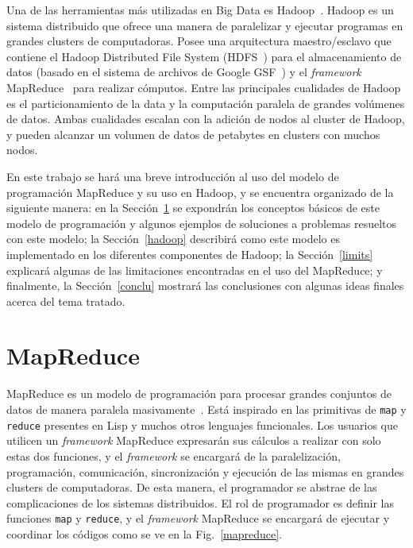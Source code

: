 \documentclass[conference]{IEEEtran}
\begin{document}
Una de las herramientas más utilizadas en Big Data es Hadoop~\cite{Hadoop}.
Hadoop es un sistema distribuido que ofrece una manera de paralelizar y ejecutar programas en grandes clusters de computadoras.
Posee una arquitectura maestro/esclavo que contiene el Hadoop Distributed File System (HDFS~\cite{HDFS10}) para el almacenamiento de datos (basado en el sistema de archivos de Google GSF~\cite{GoogleFS03}) y el \textit{framework} MapReduce~\cite{MapReduce04}\cite{MapReduceII08} para realizar cómputos.
Entre las principales cualidades de Hadoop es el particionamiento de la data y la computación paralela de grandes volúmenes de datos.
Ambas cualidades escalan con la adición de nodos al cluster de Hadoop, y pueden alcanzar un volumen de datos de petabytes en clusters con muchos nodos.



En este trabajo se hará una breve introducción al uso del modelo de programación MapReduce y su uso en Hadoop, y se encuentra organizado de la siguiente manera: 
en la Sección~\ref{map} se expondrán los conceptos básicos de este modelo de programación y algunos ejemplos de soluciones a problemas resueltos con este modelo;
la Sección~\ref{hadoop} describirá como este modelo es implementado en los diferentes componentes de Hadoop;
la Sección~\ref{limits} explicará algunas de las limitaciones encontradas en el uso del MapReduce; y 
finalmente, la Sección~\ref{conclu} mostrará las conclusiones con algunas ideas finales acerca del tema tratado.






\section{MapReduce}
\label{map}

MapReduce es un modelo de programación para procesar grandes conjuntos de datos de manera paralela masivamente~\cite{MapReduce04}.
Está inspirado en las primitivas de \texttt{map} y \texttt{reduce} presentes en Lisp y muchos otros lenguajes funcionales.
Los usuarios que utilicen un \textit{framework} MapReduce expresarán sus cálculos a realizar con solo estas dos funciones, y el \textit{framework} se encargará de la paralelización, programación, comunicación, sincronización y ejecución de las mismas en grandes clusters de computadoras.
De esta manera, el programador se abstrae de las complicaciones de los sistemas distribuidos. 
El rol de programador es definir las funciones \texttt{map} y \texttt{reduce}, y el \textit{framework} MapReduce se encargará de ejecutar y coordinar los códigos como se ve en la Fig.~\ref{mapreduce}.
\end{document}
